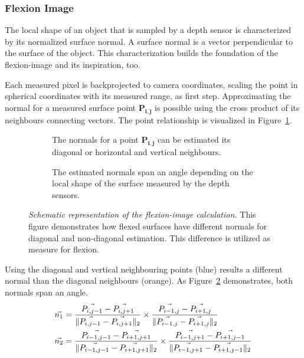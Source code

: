 \subsubsection{Flexion Image}\label{flexion-image-section}

The local shape of an object that is sampled by a depth sensor is characterized by its normalized surface normal.
A surface normal is a vector perpendicular to the surface of the object.
This characterization builds the foundation of the \Gls{flexion-image} and its inspiration, too.\pagebreak[4]

Each measured pixel is backprojected to camera coordinates, scaling the point in spherical coordinates with its measured range, as first step.
Approximating the normal for a measured surface point $\mathbf{P_{i,j}}$ is possible using the cross product of its neighbours connecting vectors.
The point relationship is visualized in Figure~\ref{fig:flexion_normals_plane}.
\begin{figure}[H]
    \begin{subfigure}[t]{0.48\linewidth}
        \centering
        \scalebox{1.0}{%
        
        }
        \caption{The normals for a point $\mathbf{P_{i,j}}$ can be estimated its diagonal or horizontal and vertical neighbours.}\label{fig:flexion_normals_plane}
    \end{subfigure}\quad
    \begin{subfigure}[t]{0.49\linewidth}
        \centering
        \scalebox{1.0}{%
        
        }
        \caption{The estimated normals span an angle depending on the local shape of the surface measured by the depth sensors.}\label{fig:flexion_space}
    \end{subfigure}
    \caption[Schematic representation of the \gls{flexion-image} calculation]{\emph{Schematic representation of the \gls{flexion-image} calculation.} This figure demonstrates how flexed surfaces have different normals for diagonal and non-diagonal estimation. This difference is utilized as measure for flexion.}%
    \label{fig:flexion-image-scetched}
\end{figure}
Using the diagonal and vertical neighbouring points (blue) results a different normal than the diagonal neighbours (orange).
As Figure~\ref{fig:flexion_space} demonstrates, both normals span an angle.
\begin{equation}
\begin{aligned}
    \vec{n_1} &= \frac{\vec{P_{i,j-1}} - \vec{P_{i,j+1}}}{\lVert\vec{P_{i,j-1}} - \vec{P_{i,j+1}}\rVert_{2}}
                \times \frac{\vec{P_{i-1,j}} - \vec{P_{i+1,j}}}{\lVert\vec{P_{i-1,j}} - \vec{P_{i+1,j}}\rVert_{2}} \\
    \vec{n_2} &= \frac{\vec{P_{i-1,j-1}} - \vec{P_{i+1,j+1}}}{\lVert\vec{P_{i-1,j-1}} - \vec{P_{i+1,j+1}}\rVert_{2}}
                \times \frac{\vec{P_{i-1,j+1}} - \vec{P_{i+1,j-1}}}{\lVert\vec{P_{i-1,j+1}} - \vec{P_{i+1,j-1}}\rVert_{2}}
    \label{eq:flexion_normals}
\end{aligned}
\end{equation}
